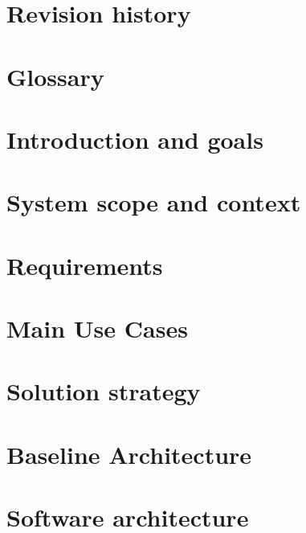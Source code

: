 \documentclass[11pt, oneside]{book}
\begin{document}


\frontmatter

\chapter{Revision history}
\label{chp:rev_his}




\chapter{Glossary}
\label{chp:glos}


\mainmatter

\chapter{Introduction and goals}
\label{chp:intro}


\chapter{System scope and context}
\label{chp:syst_context}


\chapter{Requirements}
\label{chp:requirements}


\chapter{Main Use Cases}
\label{chp:usecases}


\chapter{Solution strategy}
\label{chp:sol_strategy}



\chapter{Baseline Architecture}
\label{chp:baseline}


\chapter{Software architecture}
\label{chp:soft_arch}

\end{document}
